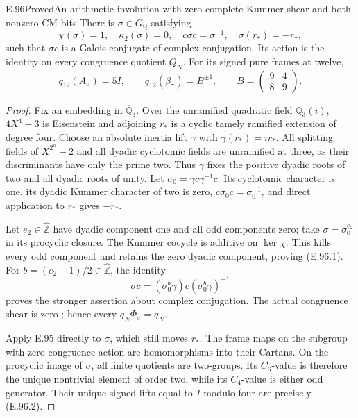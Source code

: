 \begin{result}{E.96}{Proved}{An arithmetic involution with zero complete Kummer shear and both nonzero CM bits}
There is \(\sigma\in G_{\mathbb Q}\) satisfying
\[
 \chi(\sigma)=1,\quad \kappa_2(\sigma)=0,\quad
 c\sigma c=\sigma^{-1},\quad \sigma(r_*)=-r_*,
                                                        \tag{E.96.1}
\]
such that \(\sigma c\) is a Galois conjugate of complex conjugation.
Its action is the identity on every congruence quotient \(Q_N\).
For its signed pure frames at twelve,
\[
 q_{12}(A_\sigma)=5I,\qquad
 q_{12}(\beta_\sigma)=B^{\pm1},\qquad
 B=\begin{pmatrix}9&4\\8&9\end{pmatrix}.
                                                        \tag{E.96.2}
\]
\end{result}
\begin{proof}
Fix an embedding in \(\overline{\mathbb Q}_3\).
Over the unramified quadratic field \(\mathbb Q_3(i)\),
\(4X^4-3\) is Eisenstein and adjoining \(r_*\) is a cyclic
tamely ramified extension of degree four.  Choose an absolute
inertia lift \(\gamma\) with \(\gamma(r_*)=ir_*\).
All splitting fields of \(X^{2^n}-2\) and all dyadic cyclotomic
fields are unramified at three, as their discriminants have
only the prime two.  Thus \(\gamma\) fixes the positive
dyadic roots of two and all dyadic roots of unity.
Let \(\sigma_0=\gamma c\gamma^{-1}c\).
Its cyclotomic character is one, its dyadic Kummer character
of two is zero, \(c\sigma_0c=\sigma_0^{-1}\), and direct
application to \(r_*\) gives \(-r_*\).

Let \(e_2\in\widehat{\mathbb Z}\) have dyadic component one
and all odd components zero; take
\(\sigma=\sigma_0^{e_2}\) in its procyclic closure.
The Kummer cocycle is additive on \(\ker\chi\).
This kills every odd component and retains the zero dyadic
component, proving (E.96.1).
For \(b=(e_2-1)/2\in\widehat{\mathbb Z}\), the identity
\[
 \sigma c=(\sigma_0^b\gamma)c(\sigma_0^b\gamma)^{-1}
                                                        \tag{E.96.3}
\]
proves the stronger assertion about complex conjugation.
The actual congruence shear is zero
\cite[\S4, p.776]{SymMarin2008}; hence every \(q_N\Phi_\sigma=q_N\).

Apply E.95 directly to \(\sigma\), which still moves \(r_*\).
The frame maps on the subgroup with zero congruence action are
homomorphisms into their Cartans.  On the procyclic image of
\(\sigma\), all finite quotients are two-groups.
Its \(C_6\)-value is therefore the unique nontrivial element
of order two, while its \(C_4\)-value is either odd generator.
Their unique signed lifts equal to \(I\) modulo four are
precisely (E.96.2).
\end{proof}

